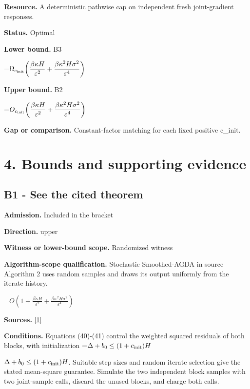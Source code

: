 \documentclass[10pt,a4paper]{article}
\newcommand{\AtlasMath}[1]{\par\begingroup\centering\setbox0=\hbox{$\displaystyle #1$}\ifdim\wd0>1.4\linewidth\typeout{ATLAS WIDE FORMULA: \the\wd0}\fi\ifdim\wd0>\linewidth\resizebox{\linewidth}{!}{\box0}\else\box0\fi\par\endgroup}
\newcommand{\AtlasInlineMath}[1]{\begingroup\setbox0=\hbox{$#1$}\ifdim\wd0>.4\linewidth\endgroup\AtlasMath{#1}\else\endgroup$#1$\fi}
\begin{document}
\textbf{Resource.} A deterministic pathwise cap on independent fresh joint-gradient responses.



\textbf{Status.} Optimal



\textbf{Lower bound.} B3



\AtlasMath{\Omega_{c_{\rm init}}\!\left(\frac{\beta\kappa H}{\varepsilon^2}+\frac{\beta\kappa^2H\sigma^2}{\varepsilon^4}\right)}


\textbf{Upper bound.} B2



\AtlasMath{O_{c_{\rm init}}\!\left(\frac{\beta\kappa H}{\varepsilon^2}+\frac{\beta\kappa^2H\sigma^2}{\varepsilon^4}\right)}


\textbf{Gap or comparison.} Constant-factor matching for each fixed positive c\_init.



\section{4. Bounds and supporting evidence}


\subsection{B1 - See the cited theorem}


\textbf{Admission.} Included in the bracket



\textbf{Direction.} upper



\textbf{Witness or lower-bound scope.} Randomized witness



\textbf{Algorithm-scope qualification.} Stochastic Smoothed-AGDA in source Algorithm 2 uses random samples and draws its output uniformly from the iterate history.



\AtlasMath{O\!\left(1+\frac{\beta\kappa H}{\varepsilon^2}+\frac{\beta\kappa^2 H\sigma^2}{\varepsilon^4}\right)}


\textbf{Sources.} \href{https://proceedings.mlr.press/v151/yang22b/yang22b.pdf}{[1]}



\textbf{Conditions.} Equations (40)-(41) control the weighted squared residuals of both blocks, with initialization \AtlasInlineMath{\Delta+b_0\le(1+c_{\rm init})H}. Suitable step sizes and random iterate selection give the stated mean-square guarantee. Simulate the two independent block samples with two joint-sample calls, discard the unused blocks, and charge both calls.
\end{document}
